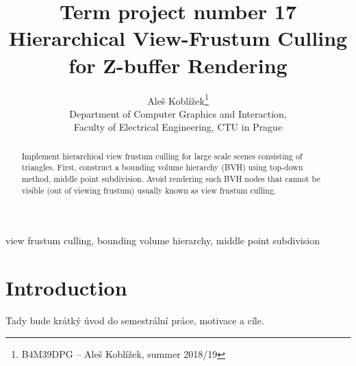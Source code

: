 \documentclass[report,11pt]{elsarticle}
\begin{document}
\begin{frontmatter}

\title{Term project number 17\\ Hierarchical View-Frustum Culling for Z-buffer Rendering}

\author{Aleš Koblížek\footnote{B4M39DPG -- Aleš Koblížek, summer 2018/19}\\
Department of Computer Graphics and Interaction,\\ Faculty of Electrical Engineering, CTU in Prague
}

\date{}


\begin{abstract}
Implement hierarchical view frustum culling for large scale scenes consisting of triangles. First, construct a bounding volume hierarchy (BVH) using top-down method, middle point subdivision. Avoid rendering such BVH nodes that cannot be visible (out of viewing frustum) usually known as view frustum culling.
\end{abstract}

\begin{keyword}
view frustum culling, bounding volume hierarchy, middle point subdivision
\end{keyword}

\end{frontmatter}



\section{\label{SEC:Intro}Introduction}

Tady bude krátký úvod do semestrální práce, motivace a cíle.

\end{document}
